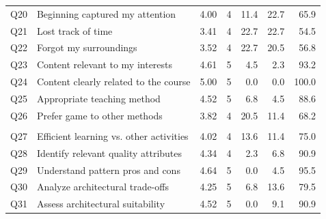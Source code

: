 \begin{table}[htbp]
\begin{tabular}{llrrrrr}
Q20 & Beginning captured my attention & 4.00 & 4 & 11.4 & 22.7 & 65.9 \\
Q21 & Lost track of time & 3.41 & 4 & 22.7 & 22.7 & 54.5 \\
Q22 & Forgot my surroundings & 3.52 & 4 & 22.7 & 20.5 & 56.8 \\
Q23 & Content relevant to my interests & 4.61 & 5 & 4.5 & 2.3 & 93.2 \\
Q24 & Content clearly related to the course & 5.00 & 5 & 0.0 & 0.0 & 100.0 \\
Q25 & Appropriate teaching method & 4.52 & 5 & 6.8 & 4.5 & 88.6 \\
Q26 & Prefer game to other methods & 3.82 & 4 & 20.5 & 11.4 & 68.2 \\
\addlinespace
\multicolumn{7}{l}{\textit{Perceived learning}} \\
Q27 & Efficient learning vs. other activities & 4.02 & 4 & 13.6 & 11.4 & 75.0 \\
Q28 & Identify relevant quality attributes & 4.34 & 4 & 2.3 & 6.8 & 90.9 \\
Q29 & Understand pattern pros and cons & 4.64 & 5 & 0.0 & 4.5 & 95.5 \\
Q30 & Analyze architectural trade-offs & 4.25 & 5 & 6.8 & 13.6 & 79.5 \\
Q31 & Assess architectural suitability & 4.52 & 5 & 0.0 & 9.1 & 90.9 \\
\bottomrule
\end{tabular}
\end{table}
